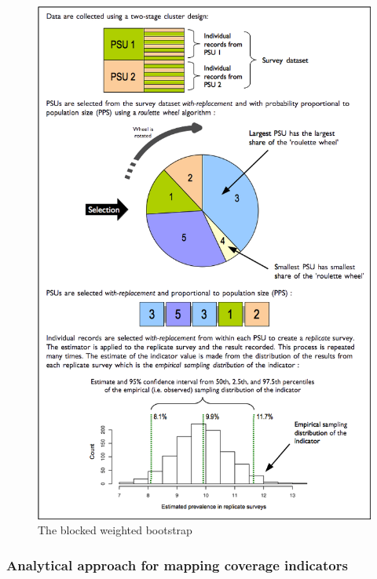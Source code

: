 \documentclass[12pt,a4paper]{article}
\theoremstyle{definition}
\theoremstyle{definition}
\theoremstyle{definition}
\theoremstyle{remark}
\begin{document}
\begin{figure}[H]

{\centering \includegraphics[width=9.76in]{figures/bbw} 

}

\caption{The blocked weighted bootstrap}\label{fig:indicators31}
\end{figure}

\hypertarget{analytical-approach-for-mapping-coverage-indicators}{%
\subsubsection{Analytical approach for mapping coverage
indicators}\label{analytical-approach-for-mapping-coverage-indicators}}
\end{document}
